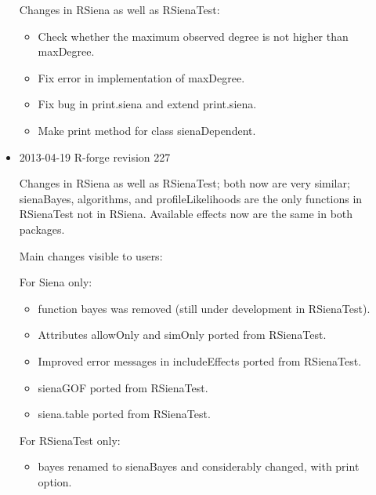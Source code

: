 \documentclass[a4paper,fleqn,11pt]{article}
\newcommand{\+}{\, + \,}
\newcommand{\sfn}[1]{\textsf{#1}}
\begin{document}
\begin{small}
\begin{itemize}
Changes in \textsf{RSiena} as well as \textsf{RSienaTest}:
  \begin{itemize}
   \item Check whether the maximum observed degree is not higher than
     \sfn{maxDegree}.
	\item Fix error in implementation of \sfn{maxDegree}.
	\item Fix bug in \sfn{print.siena} and extend \sfn{print.siena}.
	\item Make print method for class \textsf{sienaDependent}.
  \end{itemize}
\item 2013-04-19 R-forge revision 227

  Changes in \textsf{RSiena} as well as \textsf{RSienaTest};
  both now are very similar; \textsf{sienaBayes}, \sfn{algorithms}, and
  \sfn{profileLikelihoods}
  are the only functions in \textsf{RSienaTest} not in RSiena.
  Available effects now are the same in both packages.

  Main changes visible to users:

For Siena only:
  \begin{itemize}
	\item function \sfn{bayes} was removed (still under development in
        \textsf{RSienaTest}).
	\item Attributes \sfn{allowOnly} and \sfn{simOnly} ported from
        \textsf{RSienaTest}.
	\item Improved error messages in  \sfn{includeEffects} ported from
        \textsf{RSienaTest}.
	\item \sfn{sienaGOF} ported from \textsf{RSienaTest}.
	\item \sfn{siena.table} ported from \textsf{RSienaTest}.
  \end{itemize}

For \textsf{RSienaTest} only:
  \begin{itemize}
	\item \sfn{bayes} renamed to \sfn{sienaBayes} and considerably changed,
         with print option.
  \end{itemize}


\end{itemize}
\end{small}
\end{document}
